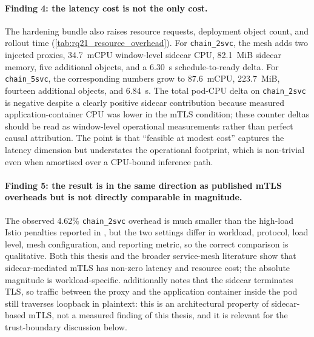 \paragraph{Finding 4: the latency cost is not the only cost.}
The hardening bundle also raises resource requests, deployment object count,
and rollout time (\cref{tab:rq21_resource_overhead}). For
\texttt{chain\_2svc}, the mesh adds two injected proxies, 34.7~mCPU
window-level sidecar CPU, 82.1~MiB sidecar memory, five additional objects,
and a 6.30~s schedule-to-ready delta. For \texttt{chain\_5svc}, the
corresponding numbers grow to 87.6~mCPU, 223.7~MiB, fourteen additional
objects, and 6.84~s. The total pod-CPU delta on \texttt{chain\_2svc} is
negative despite a clearly positive sidecar contribution because measured
application-container CPU was lower in the mTLS condition; these counter
deltas should be read as window-level operational measurements rather than
perfect causal attribution. The point is that ``feasible at modest cost''
captures the latency dimension but understates the operational footprint,
which is non-trivial even when amortised over a CPU-bound inference path.

\paragraph{Finding 5: the result is in the same direction as published mTLS
overheads but is not directly comparable in magnitude.}
The observed 4.62\% \texttt{chain\_2svc} overhead is much smaller than the
high-load Istio penalties reported in
\cite{bremlerbarr2025mtls}, but the two settings differ in workload,
protocol, load level, mesh configuration, and reporting metric, so the
correct comparison is qualitative. Both this thesis and the broader
service-mesh literature show that sidecar-mediated mTLS has non-zero
latency and resource cost; the absolute magnitude is workload-specific.
\cite{meshinsight_socc23} additionally notes that the sidecar terminates
TLS, so traffic between the proxy and the application container inside the
pod still traverses loopback in plaintext: this is an architectural property
of sidecar-based mTLS, not a measured finding of this thesis, and it is
relevant for the trust-boundary discussion below.

